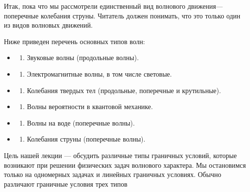 \documentclass[
]{article}
\providecommand{\tightlist}{%
  \setlength{\itemsep}{0pt}\setlength{\parskip}{0pt}}
\begin{document}
{{Итак, пока что мы рассмотрели единственный вид волнового
движения---поперечные колебания струны. Читатель должен понимать, что
это только один из видов волновых движений.

Ниже приведен перечень основных типов волн:

\begin{itemize}
\tightlist
\item
  \begin{enumerate}
  \def\labelenumi{\arabic{enumi}.}
  \tightlist
  \item
    Звуковые волны (продольные волны).
  \end{enumerate}
\item
  \begin{enumerate}
  \def\labelenumi{\arabic{enumi}.}
  \setcounter{enumi}{1}
  \tightlist
  \item
    Электромагнитные волны, в том числе световые.
  \end{enumerate}
\item
  \begin{enumerate}
  \def\labelenumi{\arabic{enumi}.}
  \setcounter{enumi}{2}
  \tightlist
  \item
    Колебания твердых тел (продольные, поперечные и крутильные).
  \end{enumerate}
\item
  \begin{enumerate}
  \def\labelenumi{\arabic{enumi}.}
  \setcounter{enumi}{3}
  \tightlist
  \item
    Волны вероятности в квантовой механике.
  \end{enumerate}
\item
  \begin{enumerate}
  \def\labelenumi{\arabic{enumi}.}
  \setcounter{enumi}{4}
  \tightlist
  \item
    Волны на воде (поперечные волны).
  \end{enumerate}
\item
  \begin{enumerate}
  \def\labelenumi{\arabic{enumi}.}
  \setcounter{enumi}{5}
  \tightlist
  \item
    Колебания струны (поперечные волны).
  \end{enumerate}
\end{itemize}

Цель нашей лекции --- обсудить различные типы граничных условий, которые
возникают при решении физических задач волнового характера. Мы
остановимся только на одномерных задачах и линейных граничных условиях.
Обычно различают граничные условия трех типов

}}
\end{document}
